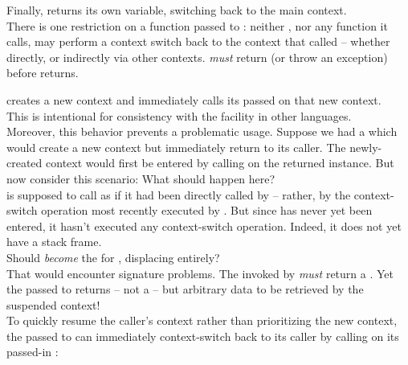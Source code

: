 Finally,  returns its own  variable, switching back to the main
context.\\

There is one restriction on a function  passed to \resumewith:
neither , nor any function it calls, may perform a context switch
back to the context that called \resumewith -- whether directly, or indirectly
via other contexts.  \emph{must} return (or throw an exception)
before \resumewith returns.



\callcc creates a new context and immediately calls its passed \entryfn on
that new context.\\

This is intentional for consistency with the \cc facility in other
languages.\cite{schemecallcc}\citecomma\cite{rubycallcc}\\

Moreover, this behavior prevents a problematic usage. Suppose we had
a  which would create a new context but immediately
return to its caller. The newly-created context would first be entered by
calling \resume on the returned \cont instance.
But now consider this scenario:
What should happen here?\\

\resumewith is supposed to call  as if it had been
directly called by  -- rather, by the context-switch
operation most recently executed by . But
since  has never yet been entered, it hasn't executed
any context-switch operation. Indeed, it does not yet have a stack frame.\\

Should  \emph{become} the \entryfn
for , displacing  entirely?\\

That would encounter signature problems. The \entryfn invoked
by \callcc \emph{must} return a \cont. Yet the  passed to \resumewith
returns -- not a \cont -- but arbitrary data to be retrieved by the suspended
context!\\

To quickly resume the caller's context rather than prioritizing the new
context, the \entryfn passed to \callcc can immediately context-switch back
to its caller by calling \resume on its passed-in \cont:

